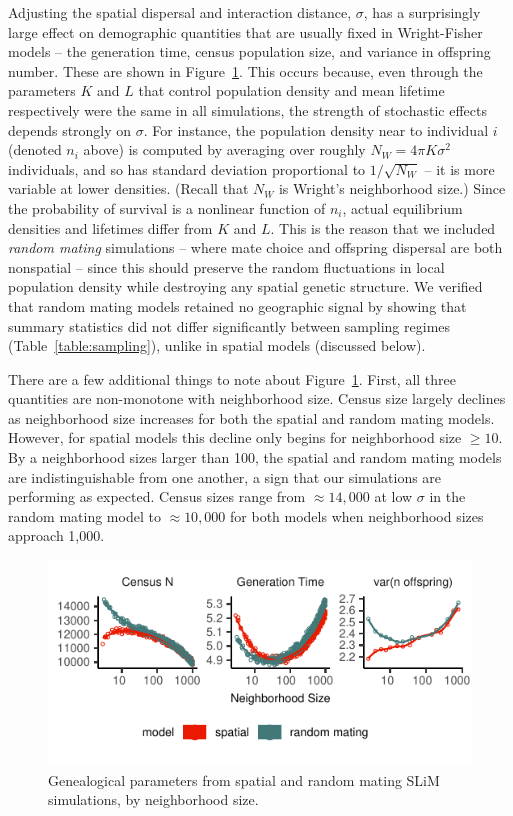 \documentclass[10pt,twoside,lineno,hidelinks]{preprint}
\begin{document}
Adjusting the spatial dispersal and interaction distance, $\sigma$,
has a surprisingly large effect on demographic quantities that are usually fixed in Wright-Fisher models --
the generation time, census population size, and variance in offspring number.
These are shown in Figure~\ref{fig:genparams}.
This occurs because,
even through the parameters $K$ and $L$ that control population density and mean lifetime respectively 
were the same in all simulations,
the strength of stochastic effects depends strongly on $\sigma$.
For instance, 
the population density near to individual $i$ (denoted $n_i$ above)
is computed by averaging over roughly $N_W = 4 \pi K \sigma^2$ individuals,
and so has standard deviation proportional to $1/\sqrt{N_W}$ --
it is more variable at lower densities.
(Recall that $N_W$ is Wright's neighborhood size.)
Since the probability of survival is a nonlinear function of $n_i$,
actual equilibrium densities and lifetimes differ from $K$ and $L$.
This is the reason that we included \emph{random mating} simulations --
where mate choice and offspring dispersal are both nonspatial --
since this should preserve the random fluctuations in local population density
while destroying any spatial genetic structure.
We verified that random mating models retained no geographic signal
by showing that summary statistics did not differ significantly between sampling regimes
(Table~\ref{table:sampling}), unlike in spatial models (discussed below).

There are a few additional things to note about Figure~\ref{fig:genparams}. 
First, all three quantities are non-monotone with neighborhood size. 
Census size largely declines as neighborhood size increases for both the spatial and random mating models. 
However, for spatial models this decline only begins for neighborhood size $\geq 10$. 
By a neighborhood sizes larger than 100, the spatial and random mating models are indistinguishable from one another, 
a sign that our simulations are performing as expected. 
Census sizes range from $\approx 14,000$ at low $\sigma$ in the random mating model to $\approx 10,000$ for both models when neighborhood sizes approach 1,000.

\begin{figure}[htbp]
\centering
\includegraphics{figures/pop_params.pdf}
\caption{Genealogical parameters from spatial and random mating SLiM simulations, by neighborhood size.}
\label{fig:genparams}
\end{figure}
\end{document}
